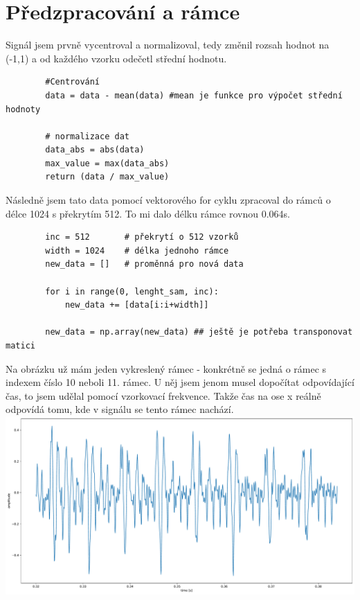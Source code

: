 \documentclass[a4paper, 11pt]{article}
\begin{document}
%
\section{Předzpracování a rámce}
    Signál jsem prvně vycentroval a normalizoval, tedy změnil rozsah hodnot na (-1,1) a od každého vzorku odečetl střední hodnotu.
     \begin{verbatim}
        #Centrování 
        data = data - mean(data) #mean je funkce pro výpočet střední hodnoty
        
        # normalizace dat 
        data_abs = abs(data)
        max_value = max(data_abs)
        return (data / max_value) 

    \end{verbatim}
    Následně jsem tato data pomocí vektorového for cyklu zpracoval do rámců o délce 1024 s překrytím 512. To mi dalo délku rámce rovnou 0.064s.
    \begin{verbatim}
        inc = 512       # překrytí o 512 vzorků
        width = 1024    # délka jednoho rámce       
        new_data = []   # proměnná pro nová data 
    
        for i in range(0, lenght_sam, inc):
            new_data += [data[i:i+width]]

        new_data = np.array(new_data) ## ještě je potřeba transponovat matici
    \end{verbatim}
    Na obrázku už mám jeden vykreslený rámec - konkrétně se jedná o rámec s indexem číslo 10 neboli 11. rámec. U něj jsem jenom musel dopočítat odpovídající čas, to jsem udělal pomocí vzorkovací frekvence. Takže čas na ose x reálně odpovídá tomu, kde v signálu se tento rámec nachází.\\ 
    
    \includegraphics[scale=0.4]{img/1_frame2.pdf}
\end{document}
